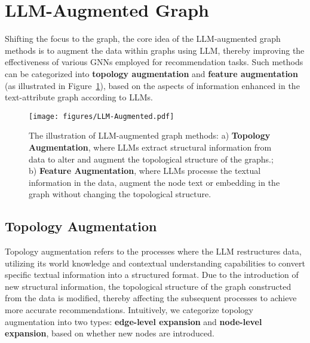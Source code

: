 \section{LLM-Augmented Graph}
Shifting the focus to the graph, the core idea of the LLM-augmented graph methods is to augment the data within graphs using LLM, thereby improving the effectiveness of various GNNs employed for recommendation tasks. Such methods can be categorized into \textbf{topology augmentation} and \textbf{feature augmentation} (as illustrated in Figure~\ref{fig:LLM-augmented graph}), based on the aspects of information enhanced in the text-attribute graph according to LLMs.
\begin{figure}[t]
    \centering
    \texttt{[image: figures/LLM-Augmented.pdf]}
    \caption{The illustration of LLM-augmented graph methods:  
    a) \textbf{Topology Augmentation}, where LLMs extract structural information from data to alter and augment the topological structure of the graphs.;  
    b) \textbf{Feature Augmentation}, where LLMs processe the textual information in the data, augment the node text or embedding in the graph without changing the topological structure.}
    \label{fig:LLM-augmented graph}
\end{figure}
\subsection{Topology Augmentation}
Topology augmentation refers to the processes where the LLM restructures data, utilizing its world knowledge and contextual understanding capabilities to convert specific textual information into a structured format. Due to the introduction of new structural information, the topological structure of the graph constructed from the data is modified, thereby affecting the subsequent processes to achieve more accurate recommendations.
Intuitively, we categorize topology augmentation into two types: \textbf{edge-level expansion} and \textbf{node-level expansion}, based on whether new nodes are introduced.

